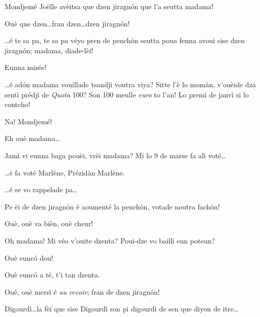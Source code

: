 \begin{drama}

\Dallasspeaks {} Mondjemé Jo\"{e}lle avèitsa que dzen jiragn\'on que l'a seutta madama!

\Joellespeaks {} Ouè que dzen\ldots fran dzen\ldots dzen jiragn\'on!

\Dallasspeaks \ldots é te sa pa, te sa pa véyo pren de pench\'on seutta poua fenna avouì sise dzen jiragn\'on; madama, diade-lèi!

\Saventaspeaks Eunna mizée!

\Dallasspeaks \ldots é ad\'on madama vouillade tsandjì voutra viya? Sitte l'è lo momàn, v'ouèide dza sentì prédjì de \textit{Quota} 100? Son 100 meulle \textit{euro} to l'an! Lo premì de janvì si lo contcho!

\Saventaspeaks Na! Mondjemé!

\Joellespeaks Eh ouè madama\ldots

\Dallasspeaks Jamì vi eunna baga pouèi, vrèi madama? Mi lo 9 de marse fa alì voté\ldots

\Joellespeaks \ldots é fa voté Marlène, Prézidàn Marlène.

\Dallasspeaks \ldots é se vo rappelade pa\ldots

\Joelledallasspeaks {} Pe èi de dzen jiragn\'on é aoumenté la pench\'on, votade noutra fach\'on!


\Saventaspeaks Ouè, ouè va bièn, ouè cheur!

\Dallasspeaks  Oh madama! Mi véo v'ouite dzenta? Poui-dze vo baillì eun poteun?

\Saventaspeaks {} Ouè eunc\'o dou!


\Saventaspeaks {} Ouè eunc\'o a té, t'i tan dzenta.

\Joellespeaks {} Ouè, ouè mersì é \textit{au revoir};  fran de dzen jiragn\'on!


\Saventaspeaks {} Digourdì\ldots la fèi que sise Digourdì son pi digourdì de sen que diyon de itre\ldots


\end{drama}
